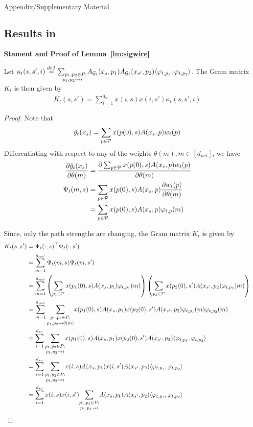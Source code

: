 
\onecolumn
\begin{center}
Appendix/Supplementary Material
\end{center}

\subsection{Results in }
\textbf{Stament and Proof of Lemma~\ref{lm:sigwire}}
\begin{lemma}
Let $\kappa_t(s,s',i)\stackrel{def}=\underset{p_1,p_2\rsa i}{\sum_{p_1,p_2\in P:}} A_{\G_t}(x_s,p_1) A_{\G_t}(x_{s'},p_2) \ip{\varphi_{t,p_1}, \varphi_{t,p_2}}$. The Gram matrix $K_t$ is then given by 
\begin{align}\label{eq:ktalg}
{K_t(s,s')}=\sum_{i=1}^{d_{in}} x(i,s)x(i,s') \kappa_t(s,s',i)
\end{align}
\end{lemma}

\begin{proof}
Note that
\begin{align*}
\hat{y}_{t}(x_s)=\sum_{p\in\P}x(p(0),s) A(x_s,p) w_t(p)
\end{align*}
Differentiating with respect to any of the weights $\theta(m),m\in[d_{net}]$, we have
\begin{align*}
\frac{\partial \hat{y}_{t}(x_s)}{\partial \theta(m)}&=\frac{\partial \sum_{p\in\P}x(p(0),s) A(x_s,p) w_t(p)}{\partial \theta(m)}\\
\Psi_t(m,s)&=\sum_{p\in\P}x(p(0),s) A(x_s,p) \frac{\partial w_t(p)}{\partial \theta(m)}\\
&=\sum_{p\in\P}x(p(0),s) A(x_s,p) \varphi_{t,p}(m)
\end{align*}

Since, only the path strengths are changing, the Gram matrix $K_t$ is given by 
\begin{align*}
K_t(s,s')&={\Psi_t(\cdot,s)}^\top \Psi_t(\cdot,s')\\
&=\sum_{m=1}^{d_{net}} \Psi_t(m,s) \Psi_t(m,s')\\
&=\sum_{m=1}^{d_{net}} \left(\sum_{p_1\in\P}x(p_1(0),s) A(x_s,p_1) \varphi_{t,p_1}(m)\right)\left(\sum_{p_2\in\P}x(p_2(0),s') A(x_{s'},p_2) \varphi_{t,p_2}(m)\right)\\
&=\sum_{m=1}^{d_{net}} \underset{p_1,p_2\rsa\theta(m)}{\sum_{p_1,p_2\in P:}} x(p_1(0),s) A(x_s,p_1)x(p_2(0),s') A(x_{s'},p_2) \varphi_{t,p_1}(m) \varphi_{t,p_2}(m)\\
&=\sum_{i=1}^{d_{in}}\underset{p_1,p_2\rsa i}{\sum_{p_1,p_2\in P:}} x(p_1(0),s) A(x_s,p_1)x(p_2(0),s') A(x_{s'},p_2) \ip{\varphi_{t,p_1}, \varphi_{t,p_2}}\\
&=\sum_{i=1}^{d_{in}}\underset{p_1,p_2\rsa i}{\sum_{p_1,p_2\in P:}} x(i,s) A(x_s,p_1)x(i,s') A(x_{s'},p_2) \ip{\varphi_{t,p_1}, \varphi_{t,p_2}}\\
&=\sum_{i=1}^{d_{in}} x(i,s)x(i,s') \underset{p_1,p_2\rsa i}{\sum_{p_1,p_2\in P:}} A(x_s,p_1) A(x_{s'},p_2) \ip{\varphi_{t,p_1}, \varphi_{t,p_2}}
\end{align*}
\end{proof}


